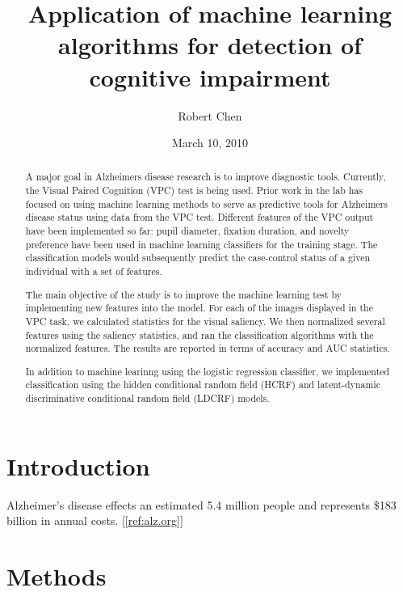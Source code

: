\documentclass{article}  %
\begin{document}
\title{Application of machine learning algorithms for detection of cognitive impairment }   %
\author{Robert Chen}         %
\date{March 10, 2010}    %
\maketitle

\begin{abstract}
A major goal in Alzheimers disease research is to improve diagnostic tools. 
Currently, the Visual Paired Cognition (VPC) test is being used. Prior work in the lab has focused on using machine learning methods to serve as predictive tools for Alzheimers disease status using data from the VPC test. Different features of the VPC output have been implemented so far: pupil diameter, fixation duration, and novelty preference have been used in machine learning classifiers for the training stage.  The classification models would subsequently predict the case-control status of a given individual with a set of features. 

The main objective of the study is to improve the machine learning test by implementing new features into the model. For each of the images displayed in the VPC task, we calculated statistics for the visual saliency. We then normalized several features using the saliency statistics, and ran the classification algorithms with the normalized features. The results are reported in terms of accuracy and AUC statistics. 

In addition to machine learinng using the logistic regression classifier, we implemented classification using the hidden conditional random field (HCRF) and latent-dynamic discriminative conditional random field (LDCRF) models.

\end{abstract}

\section{Introduction}
Alzheimer's disease effects an estimated 5.4 million people and represents \$183 billion in annual costs. [\ref{ref:alz.org}]

\section{Methods}        
\end{document}
